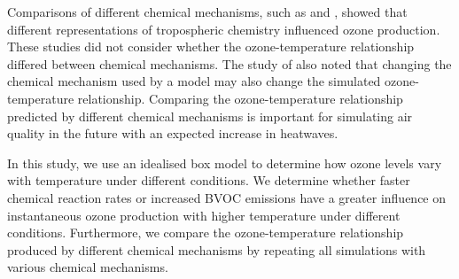 Comparisons of different chemical mechanisms, such as \citet{Emmerson:2009} and \citet{Coates:2015}, showed that different representations of tropospheric chemistry influenced ozone production.
These studies did not consider whether the ozone-temperature relationship differed between chemical mechanisms.
The study of \citet{Rasmussen:2013} also noted that changing the chemical mechanism used by a model may also change the simulated ozone-temperature relationship.
Comparing the ozone-temperature relationship predicted by different chemical mechanisms is important for simulating air quality in the future with an expected increase in heatwaves.

In this study, we use an idealised box model to determine how ozone levels vary with temperature under different  conditions.
We determine whether faster chemical reaction rates or increased BVOC emissions have a greater influence on instantaneous ozone production with higher temperature under different  conditions.
Furthermore, we compare the ozone-temperature relationship produced by different chemical mechanisms by repeating all simulations with various chemical mechanisms.

